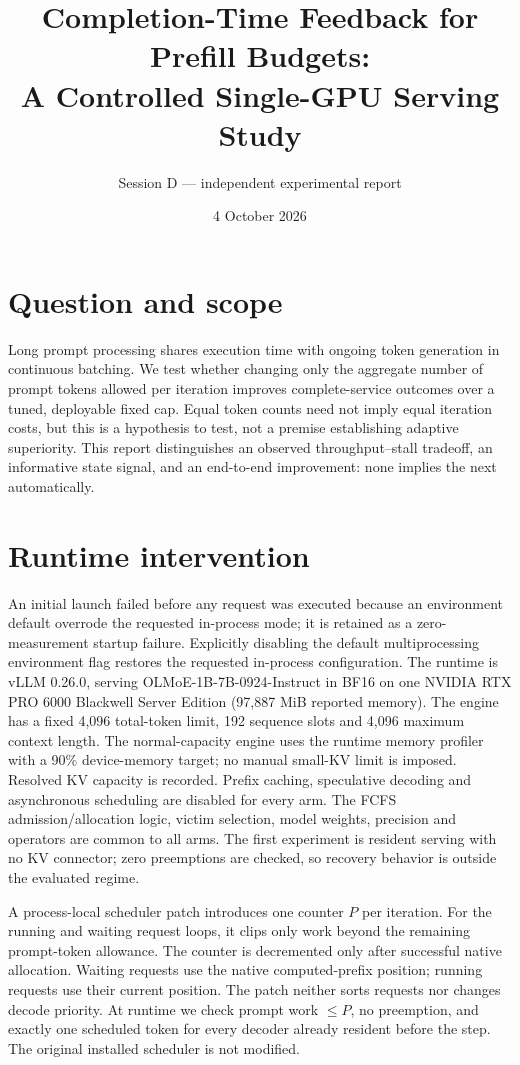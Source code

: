 \documentclass[10pt,a4paper]{article}
\title{Completion-Time Feedback for Prefill Budgets:\\A Controlled Single-GPU Serving Study}
\author{Session D --- independent experimental report}
\date{4 October 2026}
\begin{document}
\maketitle
\begin{abstract}

\end{abstract}

\section{Question and scope}
Long prompt processing shares execution time with ongoing token generation in
continuous batching. We test whether changing only the aggregate number of prompt
tokens allowed per iteration improves complete-service outcomes over a tuned,
deployable fixed cap. Equal token counts need not imply equal iteration costs,
but this is a hypothesis to test, not a premise establishing adaptive superiority.
This report distinguishes an observed throughput--stall tradeoff, an informative
state signal, and an end-to-end improvement: none implies the next automatically.

\section{Runtime intervention}
An initial launch failed before any request was executed because an environment
default overrode the requested in-process mode; it is retained as a zero-measurement
startup failure. Explicitly disabling the default multiprocessing environment
flag restores the requested in-process configuration. The runtime is vLLM 0.26.0, serving OLMoE-1B-7B-0924-Instruct in BF16 on one NVIDIA RTX PRO 6000
Blackwell Server Edition (97,887 MiB reported memory). The engine has a fixed
4,096 total-token limit, 192 sequence slots and 4,096 maximum context length. The normal-capacity
engine uses the runtime memory profiler with a 90\% device-memory target; no
manual small-KV limit is imposed. Resolved KV capacity is recorded. Prefix caching, speculative decoding and asynchronous
scheduling are disabled for every arm. The FCFS admission/allocation logic,
victim selection, model weights, precision and operators are common to all arms.
The first experiment is resident serving with no KV connector; zero preemptions
are checked, so recovery behavior is outside the evaluated regime.

A process-local scheduler patch introduces one counter $P$ per iteration. For
the running and waiting request loops, it clips only work beyond the remaining
prompt-token allowance. The counter is decremented only after successful native
allocation. Waiting requests use the native computed-prefix position; running
requests use their current position. The patch neither sorts requests nor changes
decode priority. At runtime we check prompt work $\leq P$, no preemption, and
exactly one scheduled token for every decoder already resident before the step.
The original installed scheduler is not modified.
\end{document}
